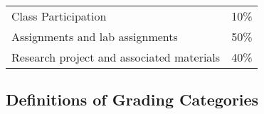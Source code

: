 \documentclass[11pt]{article} %
\begin{document}
\begin{center}
  \begin{tabular}{l|l}
\hline
	Class Participation & 10\%\\
	Assignments and lab assignments & 50\% \\
	Research project and associated materials & 40\% \\
\hline
  \end{tabular}
\end{center}


\color{black}
\noindent


\noindent
\subsection*{\textbf{Definitions of Grading Categories}}
\vspace*{-.05in}
\end{document}
